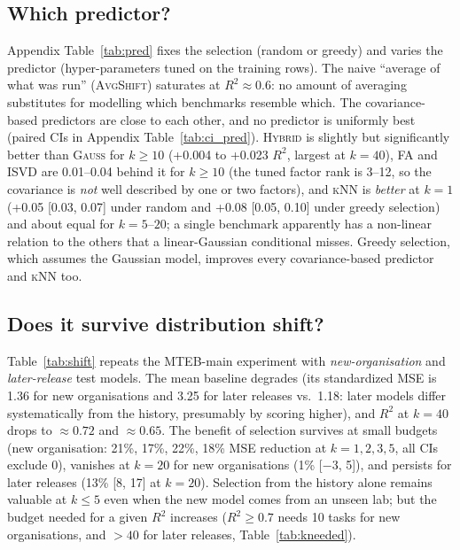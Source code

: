 \begin{table}[t]
\centering\small
\caption{Smallest $k$ reaching a target $R^2$ (``$>K$'': not reached up to the largest $k$ evaluated).}
\label{tab:kneeded}

\end{table}

\subsection{Which predictor?}
\label{sec:exp_pred}
Appendix Table~\ref{tab:pred} fixes the selection (random or greedy) and varies the predictor (hyper-parameters tuned on the training rows). The naive ``average of what was run'' (\textsc{AvgShift}) saturates at $R^2\approx0.6$: no amount of averaging substitutes for modelling which benchmarks resemble which. The covariance-based predictors are close to each other, and no predictor is uniformly best (paired CIs in Appendix Table~\ref{tab:ci_pred}). \textsc{Hybrid} is slightly but significantly better than \textsc{Gauss} for $k\ge10$ (+0.004 to +0.023 $R^2$, largest at $k=40$), \textsc{FA} and \textsc{ISVD} are 0.01--0.04 behind it for $k\ge10$ (the tuned factor rank is 3--12, so the covariance is \emph{not} well described by one or two factors), and \textsc{kNN} is \emph{better} at $k=1$ (+0.05 [0.03, 0.07] under random and +0.08 [0.05, 0.10] under greedy selection) and about equal for $k=5$--$20$; a single benchmark apparently has a non-linear relation to the others that a linear-Gaussian conditional misses. Greedy selection, which assumes the Gaussian model, improves every covariance-based predictor and \textsc{kNN} too.


\subsection{Does it survive distribution shift?}
\label{sec:exp_shift}
Table~\ref{tab:shift} repeats the MTEB-main experiment with \emph{new-organisation} and \emph{later-release} test models. The mean baseline degrades (its standardized MSE is 1.36 for new organisations and 3.25 for later releases vs.\ 1.18: later models differ systematically from the history, presumably by scoring higher), and $R^2$ at $k=40$ drops to $\approx0.72$ and $\approx0.65$. The benefit of selection survives at small budgets (new organisation: 21\%, 17\%, 22\%, 18\% MSE reduction at $k=1,2,3,5$, all CIs exclude 0), vanishes at $k=20$ for new organisations (1\% [$-3$, 5]), and persists for later releases (13\% [8, 17] at $k=20$). Selection from the history alone remains valuable at $k\le5$ even when the new model comes from an unseen lab; but the budget needed for a given $R^2$ increases ($R^2\ge0.7$ needs 10 tasks for new organisations, and $>40$ for later releases, Table~\ref{tab:kneeded}).

